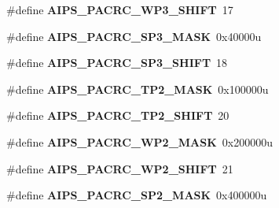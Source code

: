 \begin{DoxyCompactItemize}
\item 
\#define {\bfseries A\+I\+P\+S\+\_\+\+P\+A\+C\+R\+C\+\_\+\+W\+P3\+\_\+\+S\+H\+I\+FT}~17\hypertarget{group__AIPS__Register__Masks_gaf9ed9f32740f8b9af4e4fff3373aa627}{}\label{group__AIPS__Register__Masks_gaf9ed9f32740f8b9af4e4fff3373aa627}

\item 
\#define {\bfseries A\+I\+P\+S\+\_\+\+P\+A\+C\+R\+C\+\_\+\+S\+P3\+\_\+\+M\+A\+SK}~0x40000u\hypertarget{group__AIPS__Register__Masks_ga0fad7264426d90e124920a2f32707f69}{}\label{group__AIPS__Register__Masks_ga0fad7264426d90e124920a2f32707f69}

\item 
\#define {\bfseries A\+I\+P\+S\+\_\+\+P\+A\+C\+R\+C\+\_\+\+S\+P3\+\_\+\+S\+H\+I\+FT}~18\hypertarget{group__AIPS__Register__Masks_ga37651f58dfc2cd9b1b7105a821aa97e8}{}\label{group__AIPS__Register__Masks_ga37651f58dfc2cd9b1b7105a821aa97e8}

\item 
\#define {\bfseries A\+I\+P\+S\+\_\+\+P\+A\+C\+R\+C\+\_\+\+T\+P2\+\_\+\+M\+A\+SK}~0x100000u\hypertarget{group__AIPS__Register__Masks_ga65b51d658b2c8abdb3037dbb55de132f}{}\label{group__AIPS__Register__Masks_ga65b51d658b2c8abdb3037dbb55de132f}

\item 
\#define {\bfseries A\+I\+P\+S\+\_\+\+P\+A\+C\+R\+C\+\_\+\+T\+P2\+\_\+\+S\+H\+I\+FT}~20\hypertarget{group__AIPS__Register__Masks_ga5c2aec58b5a4cecd1d76d1a55801860f}{}\label{group__AIPS__Register__Masks_ga5c2aec58b5a4cecd1d76d1a55801860f}

\item 
\#define {\bfseries A\+I\+P\+S\+\_\+\+P\+A\+C\+R\+C\+\_\+\+W\+P2\+\_\+\+M\+A\+SK}~0x200000u\hypertarget{group__AIPS__Register__Masks_ga89265c4517a1b3edad3dd51d68965a56}{}\label{group__AIPS__Register__Masks_ga89265c4517a1b3edad3dd51d68965a56}

\item 
\#define {\bfseries A\+I\+P\+S\+\_\+\+P\+A\+C\+R\+C\+\_\+\+W\+P2\+\_\+\+S\+H\+I\+FT}~21\hypertarget{group__AIPS__Register__Masks_ga9642e0ef37faa352c0e6383ae1184dd5}{}\label{group__AIPS__Register__Masks_ga9642e0ef37faa352c0e6383ae1184dd5}

\item 
\#define {\bfseries A\+I\+P\+S\+\_\+\+P\+A\+C\+R\+C\+\_\+\+S\+P2\+\_\+\+M\+A\+SK}~0x400000u\hypertarget{group__AIPS__Register__Masks_ga6bac5e2ed8cdc194471ffdd39e202b10}{}\label{group__AIPS__Register__Masks_ga6bac5e2ed8cdc194471ffdd39e202b10}


\end{DoxyCompactItemize}
